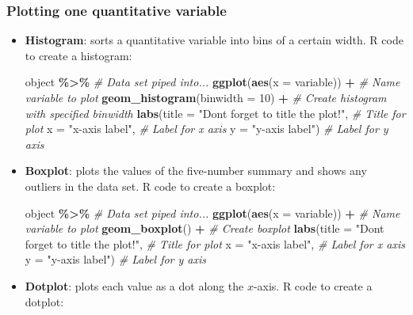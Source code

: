 \documentclass[
]{report}
\newenvironment{Shaded}{\begin{snugshade}}{\end{snugshade}}
\newcommand{\AttributeTok}[1]{\textcolor[rgb]{0.13,0.29,0.53}{#1}}
\newcommand{\CommentTok}[1]{\textcolor[rgb]{0.56,0.35,0.01}{\textit{#1}}}
\newcommand{\DecValTok}[1]{\textcolor[rgb]{0.00,0.00,0.81}{#1}}
\newcommand{\FunctionTok}[1]{\textcolor[rgb]{0.13,0.29,0.53}{\textbf{#1}}}
\newcommand{\NormalTok}[1]{#1}
\newcommand{\SpecialCharTok}[1]{\textcolor[rgb]{0.81,0.36,0.00}{\textbf{#1}}}
\newcommand{\StringTok}[1]{\textcolor[rgb]{0.31,0.60,0.02}{#1}}
\begin{document}
\subsubsection*{Plotting one quantitative variable}\label{plotting-one-quantitative-variable}

\begin{itemize}
\item
  \textbf{Histogram}: sorts a quantitative variable into bins of a certain width. R code to create a histogram:

\begin{Shaded}
\begin{Highlighting}[]
\NormalTok{object }\SpecialCharTok{\%\textgreater{}\%} \CommentTok{\# Data set piped into...}
    \FunctionTok{ggplot}\NormalTok{(}\FunctionTok{aes}\NormalTok{(}\AttributeTok{x =}\NormalTok{ variable)) }\SpecialCharTok{+}   \CommentTok{\# Name variable to plot}
    \FunctionTok{geom\_histogram}\NormalTok{(}\AttributeTok{binwidth =} \DecValTok{10}\NormalTok{) }\SpecialCharTok{+}  \CommentTok{\# Create histogram with specified binwidth}
    \FunctionTok{labs}\NormalTok{(}\AttributeTok{title =} \StringTok{"Don\textquotesingle{}t forget to title the plot!"}\NormalTok{, }\CommentTok{\# Title for plot}
        \AttributeTok{x =} \StringTok{"x{-}axis label"}\NormalTok{, }\CommentTok{\# Label for x axis}
        \AttributeTok{y =} \StringTok{"y{-}axis label"}\NormalTok{) }\CommentTok{\# Label for y axis}
\end{Highlighting}
\end{Shaded}
\item
  \textbf{Boxplot}: plots the values of the five-number summary and shows any outliers in the data set. R code to create a boxplot:

\begin{Shaded}
\begin{Highlighting}[]
\NormalTok{object }\SpecialCharTok{\%\textgreater{}\%} \CommentTok{\# Data set piped into...}
    \FunctionTok{ggplot}\NormalTok{(}\FunctionTok{aes}\NormalTok{(}\AttributeTok{x =}\NormalTok{ variable)) }\SpecialCharTok{+} \CommentTok{\# Name variable to plot}
    \FunctionTok{geom\_boxplot}\NormalTok{() }\SpecialCharTok{+} \CommentTok{\# Create boxplot }
    \FunctionTok{labs}\NormalTok{(}\AttributeTok{title =} \StringTok{"Don\textquotesingle{}t forget to title the plot!"}\NormalTok{, }\CommentTok{\# Title for plot}
        \AttributeTok{x =} \StringTok{"x{-}axis label"}\NormalTok{, }\CommentTok{\# Label for x axis}
        \AttributeTok{y =} \StringTok{"y{-}axis label"}\NormalTok{) }\CommentTok{\# Label for y axis}
\end{Highlighting}
\end{Shaded}
\item
  \textbf{Dotplot}: plots each value as a dot along the \(x\)-axis. R code to create a dotplot:


\end{itemize}
\end{document}
